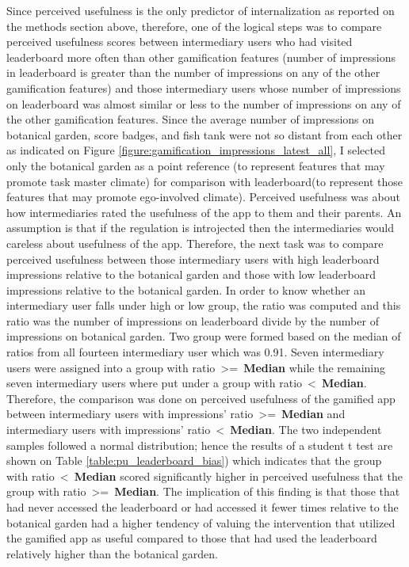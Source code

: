 Since perceived usefulness is the only predictor of internalization as reported on the methods section above, therefore, one of the logical steps was to compare perceived usefulness scores between intermediary users who had visited leaderboard more often than other gamification features (number of impressions in leaderboard is greater than the number of impressions on any of the other gamification features) and those intermediary users whose number of impressions on leaderboard was almost similar or less to the number of impressions on any of the other gamification features. Since the average number of impressions on botanical garden, score badges, and fish tank were not so distant from each other as indicated on Figure \ref{figure:gamification_impressions_latest_all}, I selected only the botanical garden as a point reference (to represent features that may promote task master climate) for comparison with leaderboard(to represent those features that may promote ego-involved climate). Perceived usefulness was about how intermediaries rated the usefulness of the app to them and their parents. An assumption is that if the regulation is introjected then the intermediaries would careless about usefulness of the app. Therefore, the next task was to compare perceived usefulness between those intermediary users with high leaderboard impressions relative to the botanical garden and those with low leaderboard impressions relative to the botanical garden. In order to know whether an intermediary user falls under high or low group, the ratio was computed and this ratio was the number of impressions on leaderboard divide by the number of impressions on botanical garden. Two group were formed based on the median of ratios from all fourteen intermediary user which was 0.91. Seven intermediary users were assigned into a group with ratio~\textgreater=~\textbf{Median} while the remaining seven intermediary users where put under a group with ratio~\textless~\textbf{Median}. Therefore, the comparison was done on perceived usefulness of the gamified app between intermediary users with impressions' ratio~\textgreater=~\textbf{Median} and intermediary users with impressions' ratio~\textless~\textbf{Median}. The two independent samples followed a normal distribution; hence the results  of a student t test are shown on Table \ref{table:pu_leaderboard_bias}) which indicates that the group with ratio~\textless~\textbf{Median} scored significantly higher in perceived usefulness that the group with ratio~\textgreater=~\textbf{Median}. The implication of this finding is that those that had never accessed the leaderboard or had accessed it fewer times relative to the botanical garden had a higher tendency of valuing the intervention that utilized the gamified app as useful compared to those that had used the leaderboard relatively higher than the botanical garden. 

